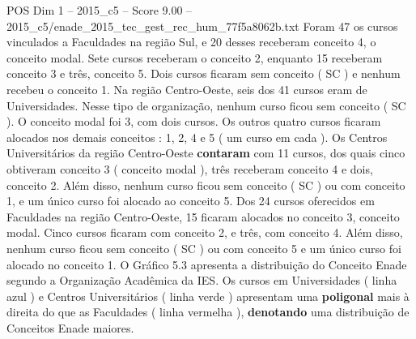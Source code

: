 \begin{textsample}{POS Dim 1 – 2015\_c5 – Score 9.00 – 2015\_c5/enade\_2015\_tec\_gest\_rec\_hum\_77f5a8062b.txt}
Foram 47 os cursos vinculados a Faculdades na região Sul, e 20 desses receberam conceito 4, o conceito modal.
Sete cursos receberam o conceito 2, enquanto 15 receberam conceito 3 e três, conceito 5.
Dois cursos ficaram sem conceito ( SC ) e nenhum recebeu o conceito 1.
Na região Centro-Oeste, seis dos 41 cursos eram de Universidades.
Nesse tipo de organização, nenhum curso ficou sem conceito ( SC ).
O conceito modal foi 3, com dois cursos.
Os outros quatro cursos ficaram alocados nos demais conceitos : 1, 2, 4 e 5 ( um curso em cada ).
Os Centros Universitários da região Centro-Oeste \textbf{contaram} com 11 cursos, dos quais cinco obtiveram conceito 3 ( conceito modal ), três receberam conceito 4 e dois, conceito 2.
Além disso, nenhum curso ficou sem conceito ( SC ) ou com conceito 1, e um único curso foi alocado ao conceito 5.
Dos 24 cursos oferecidos em Faculdades na região Centro-Oeste, 15 ficaram alocados no conceito 3, conceito modal.
Cinco cursos ficaram com conceito 2, e três, com conceito 4.
Além disso, nenhum curso ficou sem conceito ( SC ) ou com conceito 5 e um único curso foi alocado no conceito 1.
O Gráfico 5.3 apresenta a distribuição do Conceito Enade segundo a Organização Acadêmica da IES.
Os cursos em Universidades ( linha azul ) e Centros Universitários ( linha verde ) apresentam uma \textbf{poligonal} mais à direita do que as Faculdades ( linha vermelha ), \textbf{denotando} uma distribuição de Conceitos Enade maiores.

\end{textsample}

